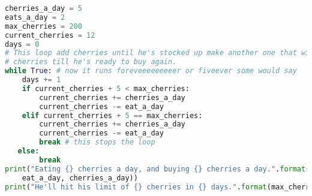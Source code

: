 \documentclass{article}
\begin{document}
\begin{lstlisting}[language=Python]
cherries_a_day = 5
eats_a_day = 2
max_cherries = 200
current_cherries = 12
days = 0
# This loop add cherries until he's stocked up make another one that will subtract  
# cherries till he's ready to buy again.
while True: # now it runs foreveeeeeeeeer or fiveever some would say
	days += 1
    if current_cherries + 5 < max_cherries:
    	current_cherries += cherries_a_day
        current_cherries -= eat_a_day
    elif current_cherries + 5 == max_cherries:
    	current_cherries += cherries_a_day
        current_cherries -= eat_a_day
        break # this stops the loop
   else:
        break
print("Eating {} cherries a day, and buying {} cherries a day.".format(
    eat_a_day, cherries_a_day))
print("He'll hit his limit of {} cherries in {} days.".format(max_cherries, days))
\end{lstlisting}
\end{document}
